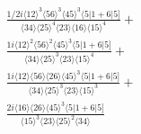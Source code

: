 \documentclass[varwidth, border=5pt]{standalone}
\begin{document}
\begin{my}
$\begin{gathered}
\scriptscriptstyle\frac{1/2i\langle12\rangle^3\langle56\rangle^3\langle45\rangle^3\langle5|1+6|5]}{\langle34\rangle\langle25\rangle^4\langle23\rangle\langle16\rangle\langle15\rangle^4}+\\
\scriptscriptstyle\frac{1i\langle12\rangle^2\langle56\rangle^2\langle45\rangle^3\langle5|1+6|5]}{\langle34\rangle\langle25\rangle^3\langle23\rangle\langle15\rangle^4}+\\
\scriptscriptstyle\frac{1i\langle12\rangle\langle56\rangle\langle26\rangle\langle45\rangle^3\langle5|1+6|5]}{\langle34\rangle\langle25\rangle^3\langle23\rangle\langle15\rangle^3}+\\
\scriptscriptstyle\frac{2i\langle16\rangle\langle26\rangle\langle45\rangle^3\langle5|1+6|5]}{\langle15\rangle^3\langle23\rangle\langle25\rangle^2\langle34\rangle}\phantom{+}
\end{gathered}$
\end{my}
\end{document}
